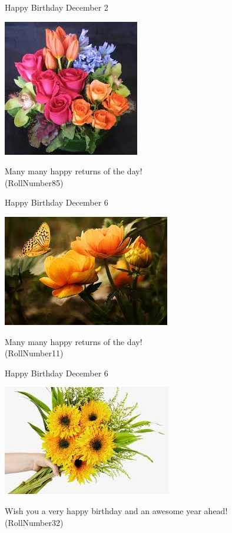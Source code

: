 \documentclass[table, landscape]{beamer}
\begin{document}
\begin{frame}{\color{red}Happy Birthday }
{December 2}
\begin{center}
\includegraphics[height=0.5\textheight]{flowers/f9.jpeg}

Many many happy returns of the day! \\ \vspace{0.5cm}{\Large name78} (RollNumber85)
\end{center}
\end{frame}
\begin{frame}{\color{red}Happy Birthday }
{December 6}
\begin{center}
\includegraphics[height=0.5\textheight]{flowers/f7.jpeg}

Many many happy returns of the day! \\ \vspace{0.5cm}{\Large name8} (RollNumber11)
\end{center}
\end{frame}
\begin{frame}{\color{red}Happy Birthday }
{December 6}
\begin{center}
\includegraphics[height=0.5\textheight]{flowers/f6.jpeg}

Wish you a very happy birthday and an awesome year ahead! \\ \vspace{0.5cm}{\Large name27} (RollNumber32)
\end{center}
\end{frame}
\end{document}
